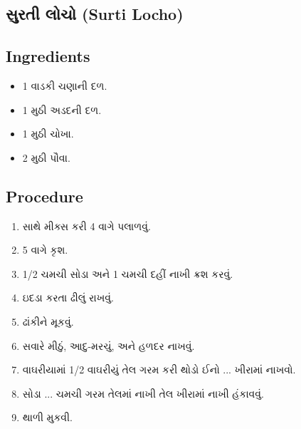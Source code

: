 \documentclass[../../recipes.tex]{subfiles}
\begin{document}
\begin{gujarati}

\chapter{સુરતી લોચો (Surti Locho)}

\section*{Ingredients}

\begin{itemize}
    \item 1 વાડકી ચણાની દળ.
    \item 1 મુઠી અડદની દળ.
    \item 1 મુઠી ચોખા.
    \item 2 મુઠી પૌવા.
\end{itemize}

\noindent
\section*{Procedure}

\begin{enumerate}
    \item સાથે મીક્સ કરી 4 વાગે પલાળવું.
    \item 5 વાગે કૃશ.
    \item 1/2 ચમચી સોડા અને 1 ચમચી દહીં નાખી ક્રશ કરવું.
    \item ઇદડા કરતા ઢીલું રાખવું.
    \item ઢાંકીને મૂકવું.
    \item સવારે મીઠું, આદુ-મરચું, અને હળદર નાખવું.
    \item વાઘરીયામાં 1/2 વાઘરીયું તેલ ગરમ કરી થોડો ઈનો ... ખીરામાં નાખવો.
    \item સોડા ... ચમચી ગરમ તેલમાં નાખી તેલ ખીરામાં નાખી હંકાવવું.
    \item થાળી મુકવી.
\end{enumerate}

\end{gujarati}
\end{document}
